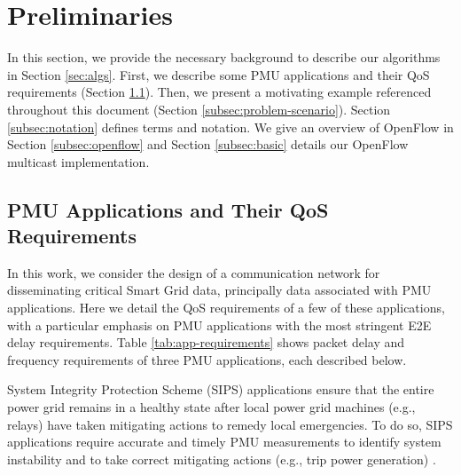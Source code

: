 
\section{Preliminaries}
\label{sec:prelim}


In this section, we provide the necessary background to describe our algorithms in Section \ref{sec:algs}. First, we describe some PMU applications and their QoS requirements 
(Section \ref{subsec:pmu-requirements}).  Then, we present a motivating example referenced throughout this document (Section \ref{subsec:problem-scenario}).
Section \ref{subsec:notation} defines terms and notation.  We give an overview of OpenFlow in Section \ref{subsec:openflow} and Section \ref{subsec:basic} details
our OpenFlow multicast implementation.


\subsection{PMU Applications and Their QoS Requirements} 
\label{subsec:pmu-requirements}

In this work, we consider the design of a communication network for disseminating critical Smart Grid data, principally data associated with PMU applications.  Here
we detail the QoS requirements of a few of these applications, with a particular emphasis on PMU applications with the most stringent E2E delay requirements.
Table \ref{tab:app-requirements} shows packet delay and frequency requirements of three PMU applications, each described below.


System Integrity Protection Scheme (SIPS) applications ensure that the entire power grid remains in a healthy state after local power grid machines (e.g., relays) 
have taken mitigating actions to remedy local emergencies.  
To do so, SIPS applications require accurate and timely PMU measurements to identify system instability and to take correct mitigating actions (e.g., trip power generation) \cite{Bakken11}.




